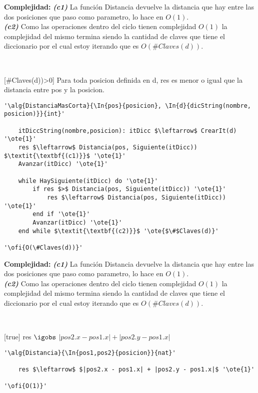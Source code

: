 \textbf{Complejidad:} \textit{\textbf{(c1)}} La función Distancia devuelve la distancia que hay entre las dos posiciones que paso como parametro, lo hace en $O(1)$. \\
\textit{\textbf{(c2)}} Como las operaciones dentro del ciclo tienen complejidad $O(1)$ la complejidad del mismo termina siendo la cantidad de claves que tiene el diccionario por el cual estoy iterando que es $O(\#Claves(d))$.

~


[\#Claves(d))>0]
{Para toda posicion definida en d, res es menor o igual que la distancia entre pos y la posicion.}



\begin{lstlisting}[mathescape]
'\alg{DistanciaMasCorta}{\In{pos}{posicion}, \In{d}{dicString(nombre, posicion)}}{int}'

	itDiccString(nombre,posicion): itDicc $\leftarrow$ CrearIt(d) '\ote{1}'
	res $\leftarrow$ Distancia(pos, Siguiente(itDicc)) $\textit{\textbf{(c1)}}$ '\ote{1}'
	Avanzar(itDicc) '\ote{1}'

	while HaySiguiente(itDicc) do '\ote{1}'
		if res $>$ Distancia(pos, Siguiente(itDicc)) '\ote{1}'
			res $\leftarrow$ Distancia(pos, Siguiente(itDicc)) '\ote{1}'
		end if '\ote{1}'
		Avanzar(itDicc) '\ote{1}'
	end while $\textit{\textbf{(c2)}}$ '\ote{$\#$Claves(d)}'

'\ofi{O(\#Claves(d))}'
\end{lstlisting}

\textbf{Complejidad:}  \textit{\textbf{(c1)}} La función Distancia devuelve la distancia que hay entre las dos posiciones que paso como parametro, lo hace en $O(1)$. \\
\textit{\textbf{(c2)}} Como las operaciones dentro del ciclo tienen complejidad $O(1)$ la complejidad del mismo termina siendo la cantidad de claves que tiene el diccionario por el cual estoy iterando que es $O(\#Claves(d))$.

~

[true]
{res $\igobs$ $|pos2.x - pos1.x| + |pos2.y - pos1.x|$}


\begin{lstlisting}[mathescape]
'\alg{Distancia}{\In{pos1,pos2}{posicion}}{nat}'

	res $\leftarrow$ $|pos2.x - pos1.x| + |pos2.y - pos1.x|$ '\ote{1}'

'\ofi{O(1)}'
\end{lstlisting}


